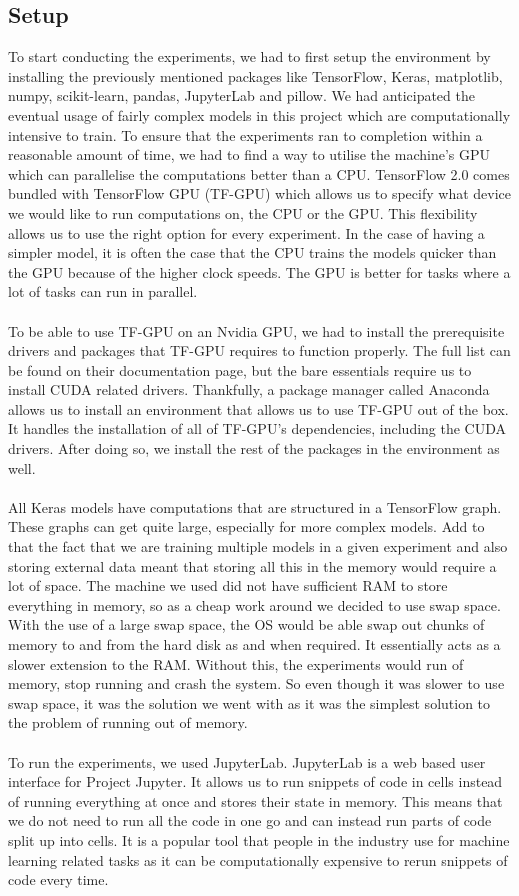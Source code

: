 \documentclass[12pt]{article}
\begin{document}
\subsection{Setup}
To start conducting the experiments, we had to first setup the environment by installing the previously mentioned packages like TensorFlow, Keras, matplotlib, numpy, scikit-learn, pandas, JupyterLab and pillow. We had anticipated the eventual usage of fairly complex models in this project which are computationally intensive to train. To ensure that the experiments ran to completion within a reasonable amount of time, we had to find a way to utilise the machine's GPU which can parallelise the computations better than a CPU. TensorFlow 2.0 comes bundled with TensorFlow GPU (TF-GPU) which allows us to specify what device we would like to run computations on, the CPU or the GPU. This flexibility allows us to use the right option for every experiment. In the case of having a simpler model, it is often the case that the CPU trains the models quicker than the GPU because of the higher clock speeds. The GPU is better for tasks where a lot of tasks can run in parallel. 
\\\\
To be able to use TF-GPU on an Nvidia GPU, we had to install the prerequisite drivers and packages that TF-GPU requires to function properly. The full list can be found on their documentation page, but the bare essentials require us to install CUDA related drivers. Thankfully, a package manager called Anaconda allows us to install an environment that allows us to use TF-GPU out of the box. It handles the installation of all of TF-GPU's dependencies, including the CUDA drivers. After doing so, we install the rest of the packages in the environment as well.
\\\\
All Keras models have computations that are structured in a TensorFlow graph. These graphs can get quite large, especially for more complex models. Add to that the fact that we are training multiple models in a given experiment and also storing external data meant that storing all this in the memory would require a lot of space. The machine we used did not have sufficient RAM to store everything in memory, so as a cheap work around we decided to use swap space. With the use of a large swap space, the OS would be able swap out chunks of memory to and from the hard disk as and when required. It essentially acts as a slower extension to the RAM. Without this, the experiments would run of memory, stop running and crash the system. So even though it was slower to use swap space, it was the solution we went with as it was the simplest solution to the problem of running out of memory. 
\\\\
To run the experiments, we used JupyterLab. JupyterLab is a web based user interface for Project Jupyter. It allows us to run snippets of code in cells instead of running everything at once and stores their state in memory. This means that we do not need to run all the code in one go and can instead run parts of code split up into cells. It is a popular tool that people in the industry use for machine learning related tasks as it can be computationally expensive to rerun snippets of code every time. 
\end{document}
